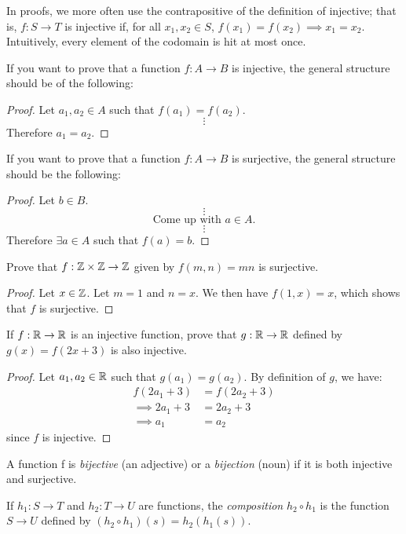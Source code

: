 In proofs, we more often use the contrapositive of the definition of injective; that is, $f: S \to T$ is injective if, for all $x_1, x_2 \in S$, $f(x_1) = f(x_2) \implies x_1 = x_2$. Intuitively, every element of the codomain is hit at most once.

If you want to prove that a function $f: A \to B$ is injective, the general structure should be of the following:
\begin{proof}
Let $a_1, a_2 \in A$ such that $f(a_1) = f(a_2)$.
\[
\vdots
\]
Therefore $a_1 = a_2$.
\end{proof}

If you want to prove that a function $f: A \to B$ is surjective, the general structure should be the following:
\begin{proof}
Let $b \in B$. 
\[
\vdots
\]
\[
\text{Come up with $a \in A$}.
\]
\[
\vdots
\]
Therefore $\exists a \in A$ such that $f(a) = b$.
\end{proof}

\begin{example}
Prove that $f : \mathbb{Z} \times \mathbb{Z} \to \mathbb{Z}$ given by $f(m,n) = mn$ is surjective.
\end{example}

\begin{proof}
Let $x \in \mathbb{Z}$. Let $m = 1$ and $n = x$. We then have $f(1, x) = x$, which shows that $f$ is surjective.
\end{proof}

\begin{example}
If $f : \mathbb{R} \to \mathbb{R}$ is an injective function, prove that $g : \mathbb{R} \to \mathbb{R}$ defined by $g(x)= f(2x+3)$ is also injective.
\end{example}

\begin{proof}
Let $a_1, a_2 \in \mathbb{R}$ such that $g(a_1) = g(a_2)$. By definition of $g$, we have:
\begin{align*}
    f(2a_1 + 3) &= f(2a_2 + 3) \\
    \implies 2a_1 + 3 &= 2a_2 + 3\\
    \implies a_1 &= a_2
\end{align*}
since $f$ is injective.
\end{proof}

\begin{definition}[Bijectivity]
A function f is \textit{bijective} (an adjective) or a \textit{bijection} (noun) if it is both injective and surjective.
\end{definition}

\begin{definition}[Composition]
If $h_1 : S \to T$ and $h_2 : T \to U$ are functions, the \textit{composition} $h_2 \circ h_1$ is the function $S \to U$ defined by $(h_2 \circ h_1)(s) = h_2(h_1(s))$.
\end{definition}

